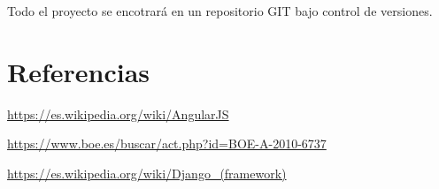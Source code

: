 \documentclass{article}
\begin{document}
Todo el proyecto se encotrará en un repositorio GIT bajo control de versiones.

\section{Referencias}
\url{https://es.wikipedia.org/wiki/AngularJS}

\url{https://www.boe.es/buscar/act.php?id=BOE-A-2010-6737}

\url{https://es.wikipedia.org/wiki/Django_(framework)}





\nocite{*}

\end{document}
